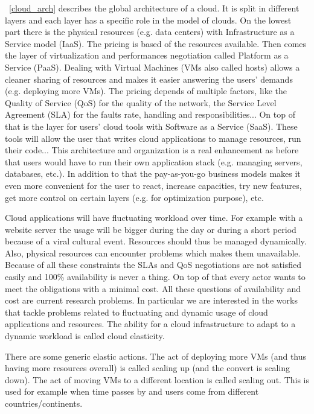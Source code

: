 \documentclass[a4paper, onecolumn, 11pt]{article}
\begin{document}
  \figurename~\ref{cloud_arch} describes the global architecture of a cloud. It
  is split in different layers and each layer has a specific role in the model
  of clouds. On the lowest part there is the physical resources (e.g. data
  centers) with Infrastructure as a Service model (IaaS). The pricing is based
  of the resources available. Then comes the layer of virtualization and
  performances negotiation called Platform as a Service (PaaS). Dealing with
  Virtual Machines (VMs also called hosts) allows a cleaner sharing of resources
  and makes it easier answering the users' demands (e.g. deploying more VMs).
  The pricing depends of multiple factors, like the Quality of Service (QoS) for
  the quality of the network, the Service Level Agreement (SLA) for the faults
  rate, handling and responsibilities... On top of that is the layer for users'
  cloud tools with Software as a Service (SaaS). These tools will allow the user
  that writes cloud applications to manage resources, run their code... This 
  architecture and organization is a real enhancement as before that users 
  would have to run their own application stack (e.g. managing servers, 
  databases, etc.). In addition to that the pay-as-you-go business models makes 
  it even more convenient for the user to react, increase capacities, try new 
  features, get more control on certain layers (e.g. for optimization purpose), 
  etc.
  
  Cloud applications will have fluctuating workload over time. For example with
  a website server the usage will be bigger during the day or during a short
  period because of a viral cultural event. Resources should thus be managed
  dynamically. Also, physical resources can encounter problems which makes them
  unavailable. Because of all these constraints the SLAs and QoS negotiations
  are not satisfied easily and 100\% availability is never a thing. On top of
  that every actor wants to meet the obligations with a minimal cost. All these
  questions of availability and cost are current research problems. In
  particular we are interested in the works that tackle problems related to
  fluctuating and dynamic usage of cloud applications and resources. The ability
  for a cloud infrastructure to adapt to a dynamic workload is called cloud
  elasticity.
  
  
  There are some generic elastic actions. The act of deploying more VMs (and
  thus having more resources overall) is called scaling up (and the convert is
  scaling down). The act of moving VMs to a different location is called scaling
  out. This is used for example when time passes by and users come from
  different countries/continents.
  
\end{document}
